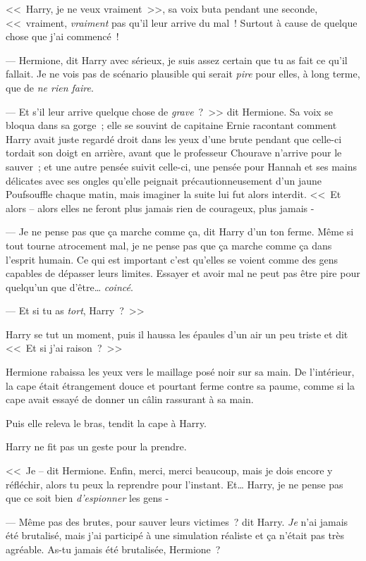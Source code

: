 <<~Harry, je ne veux vraiment~>>, sa voix buta pendant une seconde, <<~vraiment, \emph{vraiment} pas qu'il leur arrive du mal~! Surtout à cause de quelque chose que j'ai commencé~!

--- Hermione, dit Harry avec sérieux, je suis assez certain que tu as fait ce qu'il fallait. Je ne vois pas de scénario plausible qui serait \emph{pire} pour elles, à long terme, que de \emph{ne rien faire}.

--- Et s'il leur arrive quelque chose de \emph{grave}~?~>> dit Hermione. Sa voix se bloqua dans sa gorge~; elle se souvint de capitaine Ernie racontant comment Harry avait juste regardé droit dans les yeux d'une brute pendant que celle-ci tordait son doigt en arrière, avant que le professeur Chourave n'arrive pour le sauver~; et une autre pensée suivit celle-ci, une pensée pour Hannah et ses mains délicates avec ses ongles qu'elle peignait précautionneusement d'un jaune Poufsouffle chaque matin, mais imaginer la suite lui fut alors interdit. <<~Et alors -- alors elles ne feront plus jamais rien de courageux, plus jamais -

--- Je ne pense pas que ça marche comme ça, dit Harry d'un ton ferme. Même si tout tourne atrocement mal, je ne pense pas que ça marche comme ça dans l'esprit humain. Ce qui est important c'est qu'elles se voient comme des gens capables de dépasser leurs limites. Essayer et avoir mal ne peut pas être pire pour quelqu'un que d'être… \emph{coincé}.

--- Et si tu as \emph{tort}, Harry~?~>>

Harry se tut un moment, puis il haussa les épaules d'un air un peu triste et dit <<~Et si j'ai raison~?~>>

Hermione rabaissa les yeux vers le maillage posé noir sur sa main. De l'intérieur, la cape était étrangement douce et pourtant ferme contre sa paume, comme si la cape avait essayé de donner un câlin rassurant à sa main.

Puis elle releva le bras, tendit la cape à Harry.

Harry ne fit pas un geste pour la prendre.

<<~Je -- dit Hermione. Enfin, merci, merci beaucoup, mais je dois encore y réfléchir, alors tu peux la reprendre pour l'instant. Et… Harry, je ne pense pas que ce soit bien \emph{d'espionner} les gens -

--- Même pas des brutes, pour sauver leurs victimes~? dit Harry. \emph{Je} n'ai jamais été brutalisé, mais j'ai participé à une simulation réaliste et ça n'était pas très agréable. As-tu jamais été brutalisée, Hermione~?

